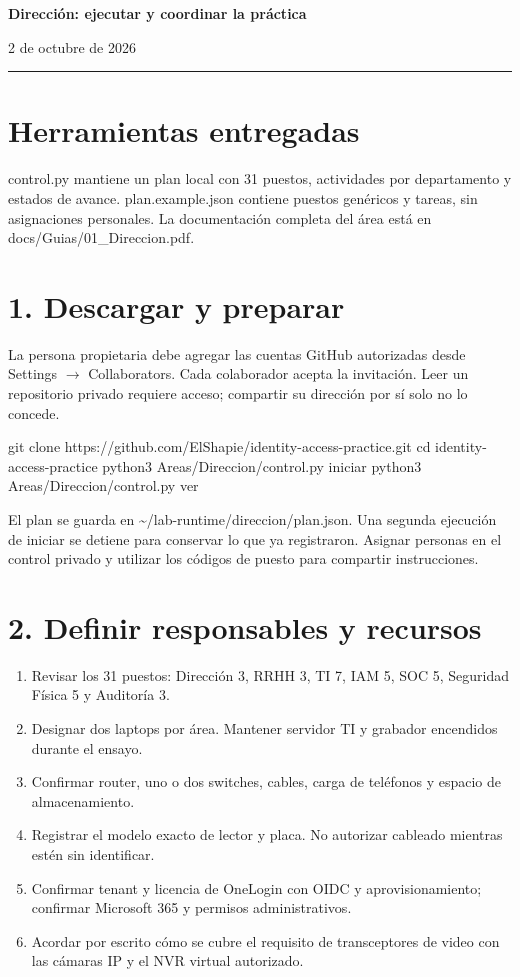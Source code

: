 \documentclass[12pt,a4paper]{article}
\begin{document}
{\LARGE\bfseries Dirección: ejecutar y coordinar la práctica\par}\vspace{6pt}
2 de octubre de 2026\par\hrule\vspace{10pt}
\section*{Herramientas entregadas}
\textnormal{control.py} mantiene un plan local con 31 puestos, actividades por departamento y estados de avance. \textnormal{plan.example.json} contiene puestos genéricos y tareas, sin asignaciones personales. La documentación completa del área está en \textnormal{docs/\allowbreak{}Guias/\allowbreak{}01\_\allowbreak{}Direccion.pdf}.\par
{}\section*{1. Descargar y preparar}
La persona propietaria debe agregar las cuentas GitHub autorizadas desde Settings \(\rightarrow\) Collaborators. Cada colaborador acepta la invitación. Leer un repositorio privado requiere acceso; compartir su dirección por sí solo no lo concede.\par
{}
\begin{Comandos}
git clone https://github.com/ElShapie/identity-access-practice.git
cd identity-access-practice
python3 Areas/Direccion/control.py iniciar
python3 Areas/Direccion/control.py ver
\end{Comandos}
El plan se guarda en \textnormal{\textasciitilde{}/\allowbreak{}lab-runtime/\allowbreak{}direccion/\allowbreak{}plan.json}. Una segunda ejecución de iniciar se detiene para conservar lo que ya registraron. Asignar personas en el control privado y utilizar los códigos de puesto para compartir instrucciones.\par
{}\section*{2. Definir responsables y recursos}
\begin{enumerate}
\item Revisar los 31 puestos: Dirección 3, RRHH 3, TI 7, IAM 5, SOC 5, Seguridad Física 5 y Auditoría 3.
\item Designar dos laptops por área. Mantener servidor TI y grabador encendidos durante el ensayo.
\item Confirmar router, uno o dos switches, cables, carga de teléfonos y espacio de almacenamiento.
\item Registrar el modelo exacto de lector y placa. No autorizar cableado mientras estén sin identificar.
\item Confirmar tenant y licencia de OneLogin con OIDC y aprovisionamiento; confirmar Microsoft 365 y permisos administrativos.
\item Acordar por escrito cómo se cubre el requisito de transceptores de video con las cámaras IP y el NVR virtual autorizado.
\end{enumerate}
\end{document}
